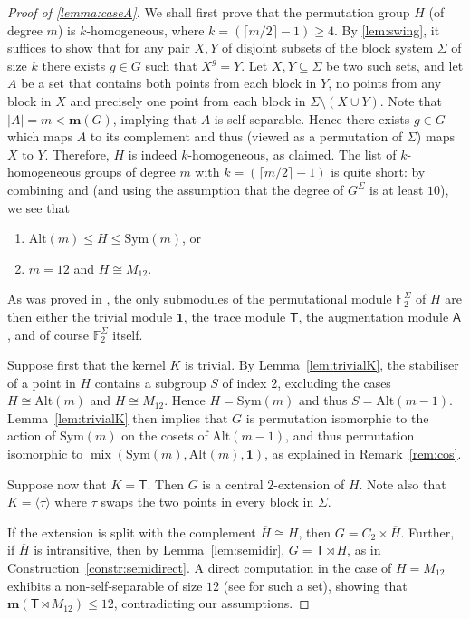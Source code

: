 \documentclass[a4paper]{amsart}
\newcommand{\Sym}{\mathrm{Sym}}
\newcommand{\Alt}{\mathrm{Alt}}
\newcommand{\FF}{\mathbb{F}}
\newcommand{\m}{\mathbf{m}}
\newcommand{\mix}{\mathop{\mathrm{mix}}}
\newcommand{\A}{\mathsf{A}}
\newcommand{\one}{\mathbf{1}}
\theoremstyle{definition}
\begin{document}
\begin{proof}[Proof of \cref{lemma:caseA}]
We shall first prove that the permutation group $H$ (of degree $m$) is $k$-homogeneous, where $k=(\lceil m/2 \rceil - 1)\ge 4$.
By \cref{lem:swing}, it suffices to show that for any pair $X, Y$ of disjoint subsets of the block system $\Sigma$ of size $k$ there exists $g \in G$ such that $X^g =Y$.
Let $X,Y \subseteq \Sigma$ be two such sets, and
let $A$ be a set that contains both points from each block in $Y$, no points from any block in $X$ and precisely one point from each block in $\Sigma \setminus (X \cup Y)$. Note that $|A| = m < \m(G)$, implying that $A$ is self-separable.
Hence there exists $g\in G$ which maps $A$ to its complement and thus (viewed as a permutation of $\Sigma$) maps $X$ to $Y$. Therefore, $H$ is indeed $k$-homogeneous, as claimed.
The list of $k$-homogeneous groups of degree $m$ with $k = (\lceil m/2 \rceil - 1)$ is quite short: by combining  \cite[Theorem~9.4B]{DixonMortimer} and \cite[Section~7]{Cameron1981} (and using the assumption that the degree of $G^\Sigma$ is at least $10$), we see that 

\begin{enumerate}[$(a)$]
    \item $\Alt(m) \le H \le \Sym(m)$, or
    \item $m = 12$ and $H \cong M_{12}$.
\end{enumerate}

As was proved in \cite{Mortimer1980}, the only submodules of the permutational module $\FF_2^\Sigma$ of $H$
are then either the trivial module $\mathbf{1}$, the trace module $\mathsf{T}$, the augmentation module $\A$, and of course
$\FF_2^\Sigma$ itself.

Suppose first that the kernel $K$ is trivial. By Lemma~\ref{lem:trivialK}, the stabiliser of a point in $H$ contains
a subgroup $S$ of index $2$, excluding the cases $H\cong \Alt(m)$ and $H\cong M_{12}$. Hence $H=\Sym(m)$
and thus $S=\Alt(m-1)$. Lemma~\ref{lem:trivialK} then implies that $G$ is permutation isomorphic to the action of
$\Sym(m)$ on the cosets of $\Alt(m-1)$, and thus permutation isomorphic to $\mix(\Sym(m),\Alt(m),\one)$,
as explained in Remark~\ref{rem:cos}.

Suppose now that $K=\mathsf{T}$. Then $G$ is a central $2$-extension of $H$. Note also that $K=\langle \tau\rangle$ where $\tau$ swaps the two points in every block in $\Sigma$.

If the extension is split with the complement $\overline{H} \cong H$, then $G = C_2 \times \overline{H}$. Further, if $\overline{H}$ is intransitive, then by Lemma~\ref{lem:semidir}, $G = \mathsf{T} \rtimes H$, as in Construction~\ref{constr:semidirect}. A direct computation in the case of $H=M_{12}$
exhibits a non-self-separable of size $12$ (see \cite{ourAlgorithm} for such a set), showing that $\m(\mathsf{T} \rtimes M_{12}) \le 12$,
contradicting our assumptions.


\end{proof}
\end{document}
